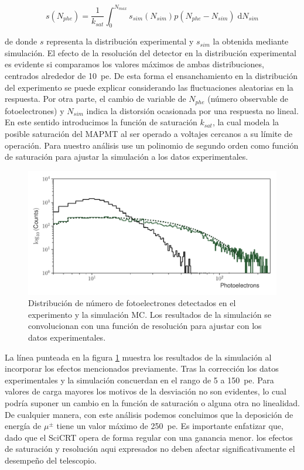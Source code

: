 \begin{equation}
\label{equ:nphe}
s(N_{phe})=\frac{1}{k_{sat}}\int_{0}^{N_{max}} s_{sim}(N_{sim})p(N_{phe}-N_{sim})\;\mathrm{d}N_{sim}
\end{equation}

de donde $s$ representa la distribución experimental y $s_{sim}$ la obtenida mediante simulación. El efecto de la resolución del detector en la distribución experimental es evidente si comparamos los valores máximos de ambas distribuciones, centrados alrededor de \SI{10}{pe}. De esta forma el ensanchamiento en la distribución del experimento se puede explicar considerando las fluctuaciones aleatorias en la respuesta. Por otra parte, el cambio de variable de $N_{phe}$ (número observable de fotoelectrones) y $N_{sim}$ indica la distorsión ocasionada por una respuesta no lineal. En este sentido introducimos la función de saturación $k_{sat}$, la cual modela la posible saturación del MAPMT al ser operado a voltajes cercanos a su límite de operación. Para nuestro análisis use un polinomio de segundo orden como función de saturación para ajustar la simulación a los datos experimentales.

\begin{figure}
        \centering
        \includegraphics[width=\textwidth]{photons-number.pdf}
        \caption{Distribución de número de fotoelectrones detectados en el experimento y la simulación MC. Los resultados de la simulación se convolucionan con una función de resolución para ajustar con los datos experimentales.}
        \label{fig:photons-number}
\end{figure}

La línea punteada en la figura \ref{fig:photons-number} muestra los resultados de la simulación al incorporar los efectos mencionados previamente. Tras la corrección los datos experimentales y la simulación concuerdan en el rango de \num{5} a \SI{150}{pe}. Para valores de carga mayores los motivos de la desviación no son evidentes, lo cual podría suponer un cambio en la función de saturación o alguna otra no linealidad. De cualquier manera, con este análisis podemos concluimos que la deposición de energía de $\mu^{\pm}$ tiene un valor máximo de \SI{250}{pe}. Es importante enfatizar que, dado que el SciCRT opera de forma regular con una ganancia menor. los efectos de saturación y resolución aqui expresados no deben afectar significativamente el desempeño del telescopio.
